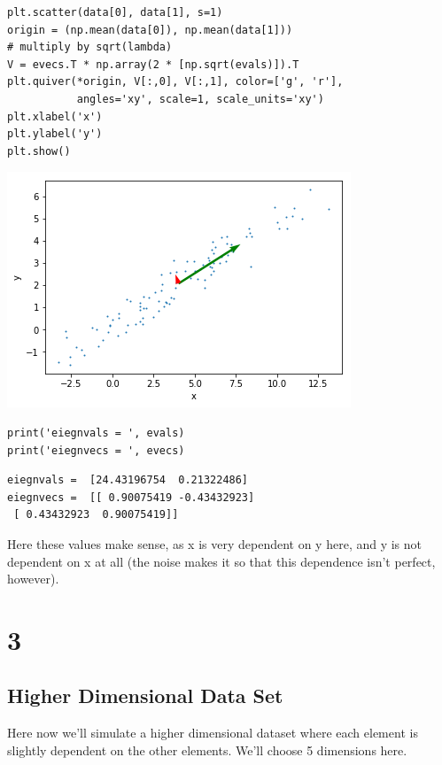 \documentclass[11pt]{article}
\begin{document}
\begin{verbatim}
plt.scatter(data[0], data[1], s=1)
origin = (np.mean(data[0]), np.mean(data[1]))
# multiply by sqrt(lambda)
V = evecs.T * np.array(2 * [np.sqrt(evals)]).T
plt.quiver(*origin, V[:,0], V[:,1], color=['g', 'r'], 
           angles='xy', scale=1, scale_units='xy')
plt.xlabel('x')
plt.ylabel('y')
plt.show()
\end{verbatim}

\includegraphics[width=.9\linewidth]{./obipy-resources/692met.png}

\begin{verbatim}
print('eiegnvals = ', evals)
print('eiegnvecs = ', evecs)
\end{verbatim}

\begin{verbatim}
eiegnvals =  [24.43196754  0.21322486]
eiegnvecs =  [[ 0.90075419 -0.43432923]
 [ 0.43432923  0.90075419]]
\end{verbatim}

Here these values make sense, as x is very dependent on y here, and y is not
dependent on x at all (the noise makes it so that this dependence isn't
perfect, however).


\section*{3}
\label{sec-3}
\subsection*{Higher Dimensional Data Set}
\label{sec-3-1}

Here now we'll simulate a higher dimensional dataset where each element is
slightly dependent on the other elements. We'll choose 5 dimensions here.
\end{document}
